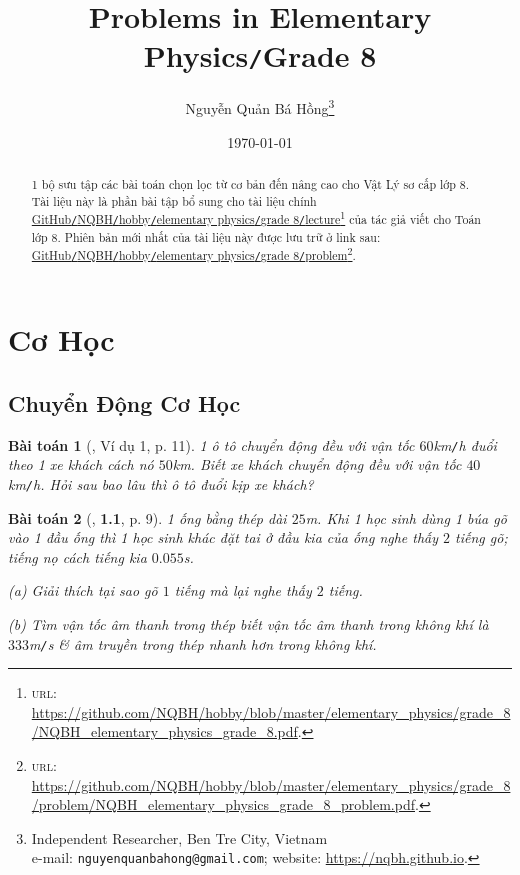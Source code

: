 \documentclass{article}
\title{Problems in Elementary Physics\texttt{/}Grade 8}
\author{Nguyễn Quản Bá Hồng\footnote{Independent Researcher, Ben Tre City, Vietnam\\e-mail: \texttt{nguyenquanbahong@gmail.com}; website: \url{https://nqbh.github.io}.}}
\date{\today}
\numberwithin{equation}{section}
\newtheorem{baitoan}{Bài toán}[section]
\begin{document}
\maketitle
\begin{abstract}
	1 bộ sưu tập các bài toán chọn lọc từ cơ bản đến nâng cao cho Vật Lý sơ cấp lớp 8. Tài liệu này là phần bài tập bổ sung cho tài liệu chính \href{https://github.com/NQBH/hobby/blob/master/elementary_physics/grade_8/NQBH_elementary_physics_grade_8.pdf}{GitHub\texttt{/}NQBH\texttt{/}hobby\texttt{/}elementary physics\texttt{/}grade 8\texttt{/}lecture}\footnote{\textsc{url}: \url{https://github.com/NQBH/hobby/blob/master/elementary_physics/grade_8/NQBH_elementary_physics_grade_8.pdf}.} của tác giả viết cho Toán lớp 8. Phiên bản mới nhất của tài liệu này được lưu trữ ở link sau: \href{https://github.com/NQBH/hobby/blob/master/elementary_physics/grade_8/problem/NQBH_elementary_physics_grade_8_problem.pdf}{GitHub\texttt{/}NQBH\texttt{/}hobby\texttt{/}elementary physics\texttt{/}grade 8\texttt{/}problem}\footnote{\textsc{url}: \url{https://github.com/NQBH/hobby/blob/master/elementary_physics/grade_8/problem/NQBH_elementary_physics_grade_8_problem.pdf}.}.
\end{abstract}
\tableofcontents
\newpage


\section{Cơ Học}

\subsection{Chuyển Động Cơ Học}

\begin{baitoan}[\cite{Thinh_Lua2021}, Ví dụ 1, p. 11]
	1 ô tô chuyển động đều với vận tốc $60$\emph{km\texttt{/}h} đuổi theo 1 xe khách cách nó $50$\emph{km}. Biết xe khách chuyển động đều với vận tốc $40$\emph{km\texttt{/}h}. Hỏi sau bao lâu thì ô tô đuổi kịp xe khách?
\end{baitoan}

\begin{baitoan}[\cite{Van2022}, \textbf{1.1}, p. 9]
	1 ống bằng thép dài $25$\emph{m}. Khi 1 học sinh dùng 1 búa gõ vào 1 đầu ống thì 1 học sinh khác đặt tai ở đầu kia của ống nghe thấy $2$ tiếng gõ; tiếng nọ cách tiếng kia $0.055$\emph{s}.
	\begin{enumerate*}
		\item[(a)] Giải thích tại sao gõ $1$ tiếng mà lại nghe thấy $2$ tiếng.
		\item[(b)] Tìm vận tốc âm thanh trong thép biết vận tốc âm thanh trong không khí là $333$\emph{m\texttt{/}s} \& âm truyền trong thép nhanh hơn trong không khí.
	\end{enumerate*}
\end{baitoan}
\end{document}
